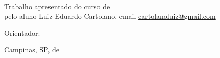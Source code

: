 \documentclass{tcc}
\begin{document}
\pagestyle{empty} %


\newpage
\begin{center}
\theauthor
\end{center}
\vspace{3in}
\begin{center}
\LARGE{\thetitle}\\
\end{center}

\vspace{2in}

\begin{flushright}
Trabalho apresentado do curso de \nomedocurso \\ pelo aluno Luiz Eduardo Cartolano, email \href{mailto:cartolanoluiz@gmail.com}{cartolanoluiz@gmail.com} 

\vspace{0.2in}

Orientador: \orientador


\end{flushright}


\vfill
\begin{center}
Campinas, SP, \MONTH de \the\year
\end{center}


\newpage

\pagestyle{plain} %
\tableofcontents

\newpage






\newpage
{} %

\newpage

\renewcommand{\refname}{\centering REFERÊNCIAS} %
\clearpage
\nocite{*}




\end{document}
